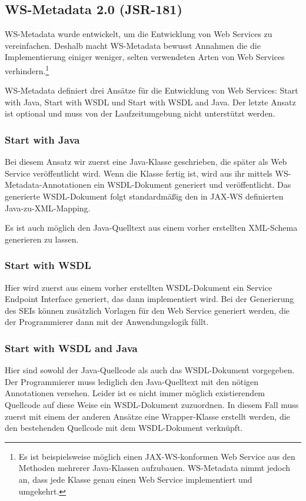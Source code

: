 \documentclass[runningheads]{llncs}
\newcommand{\germanquote}[1]{\glqq{}#1\grqq{}}
\begin{document}
  \label{jsr181}
  \subsection{WS-Metadata 2.0 (JSR-181)}
    WS-Metadata\cite{jsr_181} wurde entwickelt, um die Entwicklung von Web Services zu
    vereinfachen. Deshalb macht WS-Metadata bewusst Annahmen die die Implementierung einiger
    weniger, selten verwendeten Arten von Web Services verhindern.\footnote{Es ist beispielsweise
    möglich einen JAX-WS-konformen Web Service aus den Methoden mehrerer Java-Klassen aufzubauen.
    WS-Metadata nimmt jedoch an, dass jede Klasse genau einen Web Service implementiert und
    umgekehrt.}

    WS-Metadata definiert drei Ansätze für die Entwicklung von Web Services: \germanquote{Start
    with Java}, \germanquote{Start with WSDL} und \germanquote{Start with WSDL and Java}. Der
    letzte Ansatz ist optional und muss von der Laufzeitumgebung nicht unterstützt werden.

    \subsubsection*{Start with Java}
      Bei diesem Ansatz wir zuerst eine Java-Klasse geschrieben, die später als Web Service
      veröffentlicht wird. Wenn die Klasse fertig ist, wird aus ihr mittels
      WS-Metadata-Annotationen ein WSDL-Dokument generiert und veröffentlicht. Das generierte
      WSDL-Dokument folgt standardmäßig den in JAX-WS definierten Java-zu-XML-Mapping.

      Es ist auch möglich den Java-Quelltext aus einem vorher erstellten XML-Schema generieren zu
      lassen.

    \subsubsection*{Start with WSDL}
      Hier wird zuerst aus einem vorher erstellten WSDL-Do\-ku\-ment ein Service Endpoint Interface
      generiert, das dann implementiert wird. Bei der Generierung des SEIs können zusätzlich
      Vorlagen für den Web Service generiert werden, die der Programmierer dann mit der
      Anwendungslogik füllt.

    \subsubsection*{Start with WSDL and Java}
      Hier sind sowohl der Java-Quellcode als auch das WSDL-Dokument vorgegeben. Der Programmierer
      muss lediglich den Java-Quelltext mit den nötigen Annotationen versehen. Leider ist es nicht
      immer möglich existierendem Quellcode auf diese Weise ein WSDL-Dokument zuzuordnen. In diesem
      Fall muss zuerst mit einem der anderen Ansätze eine Wrapper-Klasse erstellt werden, die den
      bestehenden Quellcode mit dem WSDL-Dokument verknüpft.
\end{document}
